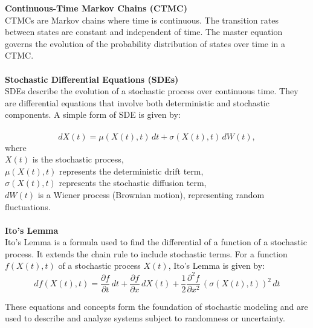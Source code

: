\documentclass[12pt]{report}
\begin{document}
\textbf{Continuous-Time Markov Chains (CTMC)}\\
CTMCs are Markov chains where time is continuous. The transition rates between
states are constant and independent of time. The master equation governs the evolution
of the probability distribution of states over time in a CTMC.\\
\\
\textbf{Stochastic Differential Equations (SDEs)}\\
SDEs describe the evolution of a stochastic process over continuous time.
They are differential equations that involve both deterministic and stochastic components.
A simple form of SDE is given by:\\
\\
\begin{equation}
    dX(t) = \mu(X(t), t) \, dt + \sigma(X(t), t) \, dW(t),
\end{equation}
where\\
\( X(t) \) is the stochastic process,\\
\( \mu(X(t), t) \) represents the deterministic drift term,\\
\( \sigma(X(t), t) \) represents the stochastic diffusion term,\\
\( dW(t) \) is a Wiener process (Brownian motion), representing random fluctuations.\\
\\
\textbf{Ito's Lemma}\\
Ito's Lemma is a formula used to find the differential of a function of a stochastic
process. It extends the chain rule to include stochastic terms.
For a function \( f(X(t), t) \) of a stochastic process \( X(t) \), Ito's Lemma is given by:\\

\begin{equation}
    df(X(t), t) = \frac{\partial f}{\partial t} \, dt + \frac{\partial f}{\partial x} \, dX(t) + \frac{1}{2} \frac{\partial^2 f}{\partial x^2} \, (\sigma(X(t), t))^2 \, dt
\end{equation}

\noindent These equations and concepts form the foundation of stochastic modeling and are used to
describe and analyze systems subject to randomness or uncertainty.
\end{document}
